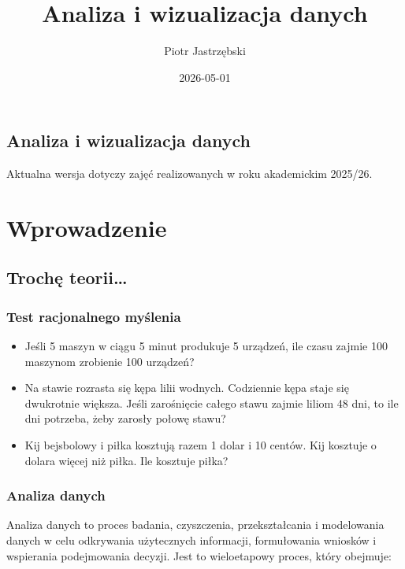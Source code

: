 \documentclass[
  polish,
  letterpaper,
  DIV=11,
  numbers=noendperiod]{scrreprt}
\title{Analiza i wizualizacja danych}
\author{Piotr Jastrzębski}
\date{2026-05-01}
\providecommand{\tightlist}{%
  \setlength{\itemsep}{0pt}\setlength{\parskip}{0pt}}
\renewcommand*\contentsname{Spis treści}
\newcommand\contentsname{Spis treści}
\begin{document}
\maketitle

\renewcommand*\contentsname{Spis treści}
{
\setcounter{tocdepth}{2}
\tableofcontents
}

\chapter{Analiza i wizualizacja
danych}\label{analiza-i-wizualizacja-danych}

Aktualna wersja dotyczy zajęć realizowanych w roku akademickim 2025/26.

\part{Wprowadzenie}

\chapter{Trochę teorii\ldots{}}\label{trochux119-teorii}

\section{Test racjonalnego
myślenia}\label{test-racjonalnego-myux15blenia}

\begin{itemize}
\tightlist
\item
  Jeśli 5 maszyn w ciągu 5 minut produkuje 5 urządzeń, ile czasu zajmie
  100 maszynom zrobienie 100 urządzeń?
\item
  Na stawie rozrasta się kępa lilii wodnych. Codziennie kępa staje się
  dwukrotnie większa. Jeśli zarośnięcie całego stawu zajmie liliom 48
  dni, to ile dni potrzeba, żeby zarosły połowę stawu?
\item
  Kij bejsbolowy i piłka kosztują razem 1 dolar i 10 centów. Kij
  kosztuje o dolara więcej niż piłka. Ile kosztuje piłka?
\end{itemize}

\section{Analiza danych}\label{analiza-danych}

Analiza danych to proces badania, czyszczenia, przekształcania i
modelowania danych w celu odkrywania użytecznych informacji,
formułowania wniosków i wspierania podejmowania decyzji. Jest to
wieloetapowy proces, który obejmuje:
\end{document}
